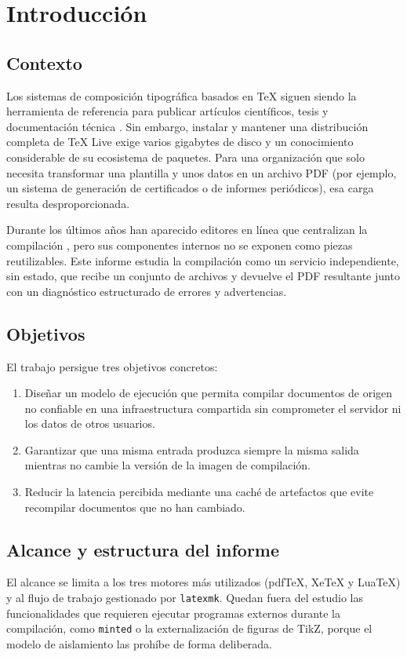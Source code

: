 \chapter{Introducción}
\label{cap:introduccion}

\section{Contexto}
Los sistemas de composición tipográfica basados en \TeX{} siguen siendo la
herramienta de referencia para publicar artículos científicos, tesis y
documentación técnica \citep{lamport1994}. Sin embargo, instalar y mantener
una distribución completa de \TeX{} Live exige varios gigabytes de disco y un
conocimiento considerable de su ecosistema de paquetes. Para una organización
que solo necesita transformar una plantilla y unos datos en un archivo PDF
(por ejemplo, un sistema de generación de certificados o de informes
periódicos), esa carga resulta desproporcionada.

Durante los últimos años han aparecido editores en línea que centralizan la
compilación \citep{overleaf2023}, pero sus componentes internos no se exponen
como piezas reutilizables. Este informe estudia la compilación como un
servicio independiente, sin estado, que recibe un conjunto de archivos y
devuelve el PDF resultante junto con un diagnóstico estructurado de errores y
advertencias.

\section{Objetivos}
El trabajo persigue tres objetivos concretos:

\begin{enumerate}[label=\textbf{O\arabic*.}]
  \item Diseñar un modelo de ejecución que permita compilar documentos de
    origen no confiable en una infraestructura compartida sin comprometer el
    servidor ni los datos de otros usuarios.
  \item Garantizar que una misma entrada produzca siempre la misma salida
    mientras no cambie la versión de la imagen de compilación.
  \item Reducir la latencia percibida mediante una caché de artefactos que
    evite recompilar documentos que no han cambiado.
\end{enumerate}

\section{Alcance y estructura del informe}
El alcance se limita a los tres motores más utilizados (pdf\TeX{}, Xe\TeX{} y
Lua\TeX{}) y al flujo de trabajo gestionado por \texttt{latexmk}. Quedan fuera
del estudio las funcionalidades que requieren ejecutar programas externos
durante la compilación, como \texttt{minted} o la externalización de figuras
de TikZ, porque el modelo de aislamiento las prohíbe de forma deliberada.

